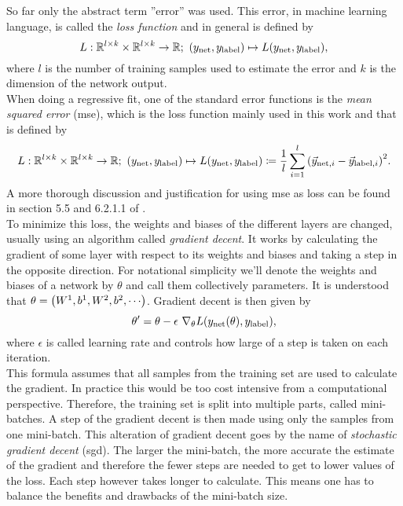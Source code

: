 So far only the abstract term ''error'' was used. This error, in machine learning language, is called the \emph{loss function} and in general is defined by
\begin{equation}\label{def:general_loss}
L:\mathbb{R}^{l\times k}\times\mathbb{R}^{l\times k}\to\mathbb{R};\ (y_\text{net}, y_\text{label})\mapsto L(y_\text{net}, y_\text{label}),
\end{equation}
where $l$ is the number of training samples used to estimate the error and $k$ is the dimension of the network output.\\
When doing a regressive fit, one of the standard error functions is the \emph{mean squared error} (\gls{mse}), which is the loss function mainly used in this work and that is defined by
\begin{equation}\label{def:loss_mean_squared_error}
L:\mathbb{R}^{l\times k}\times\mathbb{R}^{l\times k}\to\mathbb{R};\ (y_\text{net}, y_\text{label})\mapsto L(y_\text{net}, y_\text{label})\coloneqq\frac{1}{l}\sum_{i=1}^l{(\vec{y}_{\text{net},i}-\vec{y}_{\text{label},i})}^2.
\end{equation}
A more thorough discussion and justification for using \gls{mse} as loss can be found in section 5.5 and 6.2.1.1 of \cite{deep_learning_book}.\\
To minimize this loss, the weights and biases of the different layers are changed, usually using an algorithm called \emph{gradient decent}. It works by calculating the gradient of some layer with respect to its weights and biases and taking a step in the opposite direction. For notational simplicity we'll denote the weights and biases of a network by $\theta$ and call them collectively parameters. It is understood that $\theta=\lr{W^{1},b^1, W^2, b^2, \cdots}$. Gradient decent is then given by
\begin{equation}\label{def:gradient_decent}
\theta '=\theta - \epsilon\ \nabla_\theta L{\left( y_\text{net}(\theta), y_\text{label} \right)},
\end{equation}
where $\epsilon$ is called learning rate and controls how large of a step is taken on each iteration.\\
This formula assumes that all samples from the training set are used to calculate the gradient. In practice this would be too cost intensive from a computational perspective. Therefore, the training set is split into multiple parts, called mini-batches. A step of the gradient decent is then made using only the samples from one mini-batch. This alteration of gradient decent goes by the name of \emph{stochastic gradient decent} (\gls{sgd}). The larger the mini-batch, the more accurate the estimate of the gradient and therefore the fewer steps are needed to get to lower values of the loss. Each step however takes longer to calculate. This means one has to balance the benefits and drawbacks of the mini-batch size.\medskip\\

